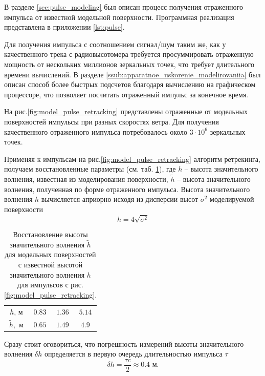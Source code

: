 В разделе \ref{sec:pulse_modeling} был описан процесс получения отраженного
импульса от известной модельной поверхности. 
Программная реализация
представлена в приложении \ref{lst:pulse}. 

Для получения импульса с соотношением сигнал/шум  таким же, как у качественного
трека с радиовысотомера требуется просуммировать отраженную мощность от
нескольких миллионов зеркальных точек, что требует длительного времени
вычислений. В разделе \ref{ssub:apparatnoe_uskorenie_modelirovaniia} был описан
способ более быстрых подсчетов благодаря вычислению на графическом процессоре,
что позволяет посчитать отраженный импульс за конечное время. 

На рис.\ref{fig:model_pulse_retracking} представлены отраженные от модельных
поверхностей импульсы при разных скоростях ветра. Для получения качественного
отраженного импульса потребовалось около $3\cdot 10^{6}$ зеркальных точек.

Применяя к импульсам на рис.\ref{fig:model_pulse_retracking} алгоритм
ретрекинга, получаем восстановленные параметры (см. таб. \ref{tab:model}),
где $h$ -- высота значительного волнения, известная из моделирования
поверхности, $\tilde h$ -- высота значительного волнения, полученная по форме
отраженного импульса. Высота значительного волнения $h$ вычисляется
априорно исходя из дисперсии высот $\sigma^2$ моделируемой поверхности \cite{waves} 
\begin{equation}
    h = 4 \sqrt{\sigma^2}
\end{equation}
\begin{table}[h]
    \centering
    \caption{Восстановление высоты значительного волнения $\tilde h$ для модельных
    поверхностей с известной высотой значительного волнения $h$ для импульсов с
рис. \ref{fig:model_pulse_retracking}.}
    \label{tab:model}
        \begin{tabular}{|c|c|c|c|}
            \hline
            $h$, м      & $0.83$ & $1.36$ & $5.14$\\
            $\tilde h,$ м & $0.65$ & $1.49$ & $4.9$\\
            \hline
        \end{tabular}
\end{table}


Сразу стоит оговориться, что погрешность измерений высоты 
значительного волнения $\delta h$ определяется в первую очередь длительностью
импульса $\tau$
\begin{equation}
    \delta h = \frac{\tau c}{2} \approx 0.4 \text{ м}.
\end{equation}

